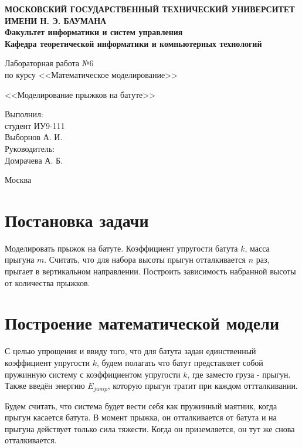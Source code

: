 \documentclass[12pt,a4paper,oneside]{extarticle}
\begin{document}
\pgfplotsset{compat=1.8}

\thispagestyle{empty}
\newpage
{
\centering


\textbf{
МОСКОВСКИЙ ГОСУДАРСТВЕННЫЙ ТЕХНИЧЕСКИЙ УНИВЕРСИТЕТ ИМЕНИ Н. Э. БАУМАНА \\
Факультет информатики и систем управления \\
Кафедра теоретической информатики и компьютерных технологий}
\bigskip
\bigskip
\bigskip
\bigskip
\bigskip
\bigskip
\bigskip

\vfill


Лабораторная работа №6 \\
по курсу <<Математическое моделирование>>

\bigskip

{\large <<Моделирование прыжков на батуте>>}
\bigskip

\vfill



\hfill\parbox{4cm} {
Выполнил:\\
студент ИУ9-111 \hfill \\
Выборнов А. И.\hfill \medskip\\
Руководитель:\\
Домрачева А. Б.\hfill
}


\vspace{\fill}

Москва \number\year
\clearpage
}



\clearpage


\section{Постановка задачи}
    Моделировать прыжок на батуте. Коэффициент упругости батута $k$, масса прыгуна $m$. Считать, что для набора высоты прыгун отталкивается $n$ раз, прыгает в вертикальном направлении. Построить зависимость набранной высоты от количества прыжков.

\section{Построение математической модели}
\label{sec:model}
    С целью упрощения и ввиду того, что для батута задан единственный коэффициент упругости $k$, будем полагать что батут представляет собой пружинную систему с коэффициентом упругости $k$, где заместо груза - прыгун. Также введён энергию $E_{jump}$, которую прыгун тратит при каждом оттталкивании.

    Будем считать, что система будет вести себя как пружинный маятник, когда прыгун касается батута. В момент прыжка, он отталкивается от батута и на прыгуна действует только сила тяжести. Когда он приземляется, он тут же снова отталкивается.
\end{document}
